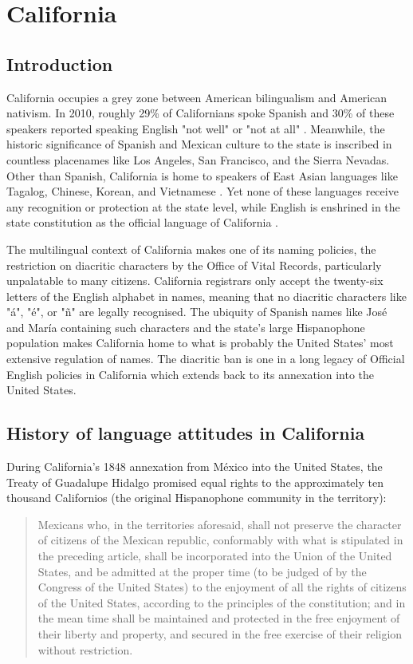 \section{California}

\subsection{Introduction}

California occupies a grey zone between American bilingualism and American
nativism. In 2010, roughly 29\% of Californians spoke Spanish and 30\% of these
speakers reported speaking English "not well" or "not at all"
\parencite{acs-lang-states}. Meanwhile, the historic significance of Spanish
and Mexican culture to the state is inscribed in countless placenames like Los
Angeles, San Francisco, and the Sierra Nevadas. Other than Spanish, California
is home to speakers of East Asian languages like Tagalog, Chinese, Korean, and
Vietnamese \parencite{acs-lang-states}. Yet none of these languages receive any
recognition or protection at the state level, while English is enshrined in the
state constitution as the official language of California \parencite{ca-const}.

The multilingual context of California makes one of its naming policies, the
restriction on diacritic characters by the Office of Vital Records,
particularly unpalatable to many citizens. California registrars only accept
the twenty-six letters of the English alphabet in names, meaning that no
diacritic characters like "á", "é", or "ñ" are legally recognised. The ubiquity
of Spanish names like José and María containing such characters and the state's
large Hispanophone population makes California home to what is probably the
United States' most extensive regulation of names. The diacritic ban is one in
a long legacy of Official English policies in California which extends back to
its annexation into the United States.

\subsection{History of language attitudes in California}

During California's 1848 annexation from México into the United States, the
Treaty of Guadalupe Hidalgo promised equal rights to the approximately ten
thousand Californios (the original Hispanophone community in the territory):

\begin{quote}
	Mexicans who, in the territories aforesaid, shall not preserve the character
	of citizens of the Mexican republic, conformably with what is stipulated in
	the preceding article, shall be incorporated into the Union of the United
	States, and be admitted at the proper time (to be judged of by the Congress
	of the United States) to the enjoyment of all the rights of citizens of the
	United States, according to the principles of the constitution; and in the
	mean time shall be maintained and protected in the free enjoyment of their
	liberty and property, and secured in the free exercise of their religion
	without restriction. \parencite{guadalupe}
\end{quote}

